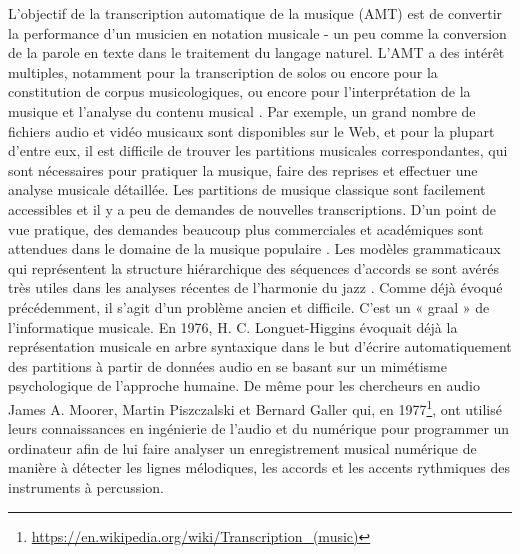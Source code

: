 L'objectif de la transcription automatique de la musique (AMT) \cite{future_directions} est de convertir la performance d'un musicien en notation musicale - un peu comme la 
conversion de la parole en texte dans le traitement du langage naturel. 
L’AMT a des intérêt  multiples, 
notamment pour la transcription de solos 
ou encore pour la constitution de corpus musicologiques, 
ou encore pour l'interprétation de la musique et l'analyse du contenu musical \cite{SHIBATA2021262}. 
Par exemple, un grand nombre de fichiers audio et vidéo musicaux sont disponibles sur le Web, et pour la plupart d'entre eux, il est difficile de trouver les partitions musicales correspondantes, qui sont nécessaires pour pratiquer la musique, faire des reprises et effectuer une analyse musicale détaillée. 
Les partitions de musique classique sont facilement accessibles et il y a peu de demandes de nouvelles transcriptions. 
%
D'un point de vue pratique, des demandes beaucoup plus commerciales et académiques sont attendues dans le domaine de la musique populaire \cite{SHIBATA2021262}. 
Les modèles grammaticaux qui représentent la structure hiérarchique des séquences d'accords se sont avérés très utiles dans les analyses récentes de l'harmonie du jazz \cite{harasimjazz}.
Comme déjà évoqué précédemment, il s’agit d’un problème ancien et difficile. 
C’est un « graal » de l’informatique musicale. En 1976, H. C. Longuet-Higgins \cite{first_one} évoquait déjà la représentation musicale en arbre syntaxique dans le but d’écrire automatiquement des partitions à partir de données audio en se basant sur un mimétisme psychologique de l’approche humaine. De même pour les chercheurs en audio James A. Moorer, Martin Piszczalski et Bernard Galler qui, en 1977\footnote{\url{https://en.wikipedia.org/wiki/Transcription_(music)}}, 
ont utilisé leurs connaissances en ingénierie de l’audio et du numérique pour programmer un ordinateur afin de lui faire analyser un enregistrement musical numérique de manière à détecter les lignes mélodiques, les accords et les accents rythmiques des instruments à percussion.

